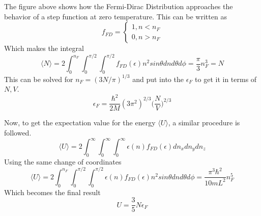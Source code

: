 The figure above shows how the Fermi-Dirac Distribution approaches the behavior of a step function at zero temperature. This can be written as
\[
f_{FD} = \begin{cases}
            1,  n < n_F \\
            0,  n > n_F
         \end{cases}
\]
Which makes the integral
\[
\langle N \rangle = 2 \int_0^{n_F} \int_0^{\pi/2} \int_0^{\pi/2} f_{FD}(\epsilon) n^2 sin\theta dn d\theta d\phi = \frac{\pi}{3} n_F^3 = N
\]
This can be solved for $n_F = (3N/\pi)^{1/3}$ and put into the $\epsilon_F$ to get it in terms of $N,V$.
\[
\epsilon_F = \frac{\hbar^2}{2M} (3\pi^2)^{2/3} \bigg( \frac{N}{V} \bigg)^{2/3}
\]

Now, to get the expectation value for the energy $\langle U \rangle$, a similar procedure is followed.
\[
\langle U \rangle = 2 \int_0^{\infty} \int_0^{\infty} \int_0^{\infty}  \epsilon(n) f_{FD}(\epsilon) dn_x dn_y dn_z
\]
Using the same change of coordinates
\[
\langle U \rangle = 2 \int_0^{n_F} \int_0^{\pi/2} \int_0^{\pi/2}  \epsilon(n) f_{FD}(\epsilon) n^2 sin\theta dn d\theta d\phi = \frac{\pi^3\hbar^2}{10mL^2} n_F^5
\]
Which becomes the final result
\[
U = \frac{3}{5} N \epsilon_F
\]